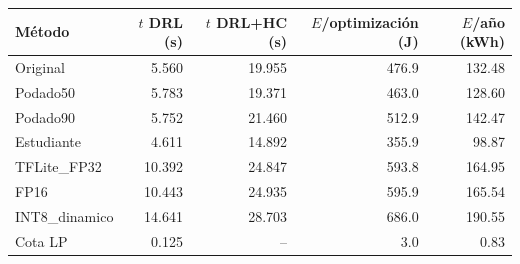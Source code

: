 \begin{tabular}{lrrrr}
\toprule
M\'etodo & $t$ DRL (s) & $t$ DRL+HC (s) & $E$/optimizaci\'on (J) & $E$/a\~no (kWh) \\
\midrule
Original & 5.560 & 19.955 & 476.9 & 132.48 \\
Podado50 & 5.783 & 19.371 & 463.0 & 128.60 \\
Podado90 & 5.752 & 21.460 & 512.9 & 142.47 \\
Estudiante & 4.611 & 14.892 & 355.9 & 98.87 \\
TFLite_FP32 & 10.392 & 24.847 & 593.8 & 164.95 \\
FP16 & 10.443 & 24.935 & 595.9 & 165.54 \\
INT8_dinamico & 14.641 & 28.703 & 686.0 & 190.55 \\
Cota LP & 0.125 & -- & 3.0 & 0.83 \\
\bottomrule
\end{tabular}